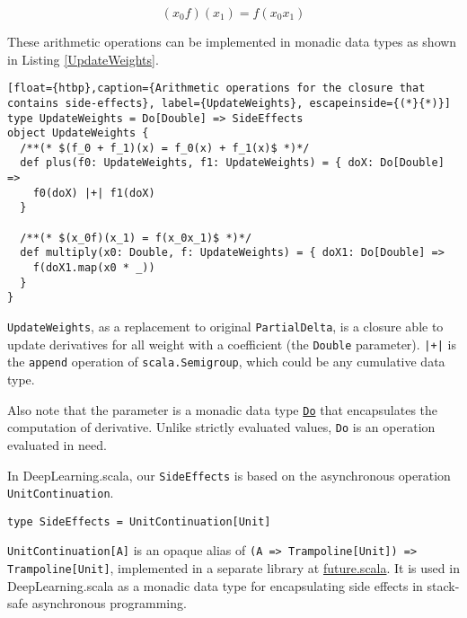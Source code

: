 \begin{equation}
\label{differentiable multiplication}
(x_0f)(x_1) = f(x_0x_1)
\end{equation}

These arithmetic operations can be implemented in monadic data types as shown in Listing \ref{UpdateWeights}.

\begin{lstlisting}[float={htbp},caption={Arithmetic operations for the closure that contains side-effects}, label={UpdateWeights}, escapeinside={(*}{*)}]
type UpdateWeights = Do[Double] => SideEffects
object UpdateWeights {
  /**(* $(f_0 + f_1)(x) = f_0(x) + f_1(x)$ *)*/
  def plus(f0: UpdateWeights, f1: UpdateWeights) = { doX: Do[Double] =>
    f0(doX) |+| f1(doX)
  }

  /**(* $(x_0f)(x_1) = f(x_0x_1)$ *)*/
  def multiply(x0: Double, f: UpdateWeights) = { doX1: Do[Double] =>
    f(doX1.map(x0 * _))
  }
}
\end{lstlisting}

\lstinline{UpdateWeights}, as a replacement to original \lstinline{PartialDelta}, is a closure able to update derivatives for all weight with a coefficient (the \lstinline{Double} parameter).
\lstinline{|+|} is the \lstinline{append} operation of \lstinline{scala.Semigroup}, which could be any cumulative data type.

Also note that the parameter is a monadic data type \href{https://javadoc.io/page/com.thoughtworks.raii/asynchronous_2.11/latest/com/thoughtworks/raii/asynchronous%24%24Do.html}{\lstinline{Do}} that encapsulates the computation of derivative. Unlike strictly evaluated values, \lstinline{Do} is an operation evaluated in need.

In DeepLearning.scala, our \lstinline{SideEffects} is based on the asynchronous operation \lstinline{UnitContinuation}.

\begin{lstlisting}[float={htbp},caption={Monadic side-effects}, label={SideEffects}]
type SideEffects = UnitContinuation[Unit]
\end{lstlisting}

\lstinline{UnitContinuation[A]} is an opaque alias \cite{erik2017opaque} of \lstinline{(A => Trampoline[Unit]) => Trampoline[Unit]}, implemented in a separate library at \href{https://github.com/ThoughtWorksInc/future.scala}{future.scala}. It is used in DeepLearning.scala as a monadic data type for encapsulating side effects in stack-safe asynchronous programming.

